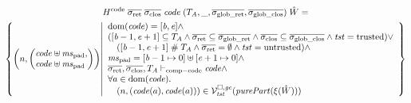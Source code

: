 \begin{multline*}
  H^\mathrm{code} \; \sigrets \; \sigcloss \; \code \; (\ta,\_,\gsigrets,\gsigcloss) \; \hat{W} =\\
  \left\{\npair{\arraycolsep=0pt\left(\array{l}\code \uplus \mspad,\\ \code \uplus \mspad\endarray\right)} \middle|
    \begin{array}{l}
    \dom(\code) = [\baddr,\eaddr] \wedge \\
      ([\baddr - 1, \eaddr + 1] \subseteq \ta \wedge \sigrets \subseteq \gsigrets \wedge \sigcloss \subseteq \gsigcloss \wedge \trust = \trusted) \vee \\
      \quad ([\baddr-1,\eaddr+1]\mathrel{\#} \ta \wedge \sigrets = \emptyset \wedge \trust =\untrusted) \wedge \\
      \mspad = [\baddr-1 \mapsto 0] \uplus [\eaddr + 1 \mapsto 0]\wedge\\
      \sigrets,\sigcloss,\ta \vdash_{\mathrm{comp-code}} \code \wedge\\
      \forall a \in \dom(\code)\ldotp\\
      \quad\npair{(\code(a),\code(a))} \in \lrvg{\trust}(\purePart{\xi(\hat{W})})
    \end{array}
  \right\}
\end{multline*}


